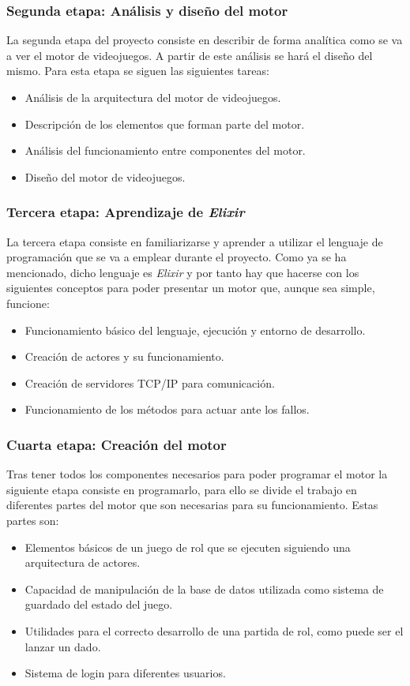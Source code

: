 \subsubsection{Segunda etapa: Análisis y diseño del motor}
La segunda etapa del proyecto consiste en describir de forma analítica como se va a ver el motor de videojuegos. A partir de este análisis se hará el diseño del mismo. Para esta etapa se siguen las siguientes tareas:
\\
\begin{itemize}
	\item Análisis de la arquitectura del motor de videojuegos.
	\item Descripción de los elementos que forman parte del motor.
	\item Análisis del funcionamiento entre componentes del motor.
	\item Diseño del motor de videojuegos.
\end{itemize}

\subsubsection{Tercera etapa: Aprendizaje de \textit{Elixir}}
La tercera etapa consiste en familiarizarse y aprender a utilizar el lenguaje de programación que se va a emplear durante el proyecto. Como ya se ha mencionado, dicho lenguaje es \textit{Elixir} y por tanto hay que hacerse con los siguientes conceptos para poder presentar un motor que, aunque sea simple, funcione:
\\
\begin{itemize}
	\item Funcionamiento básico del lenguaje, ejecución y entorno de desarrollo.
	\item Creación de actores y su funcionamiento.
	\item Creación de servidores TCP/IP para comunicación.
	\item Funcionamiento de los métodos para actuar ante los fallos.
\end{itemize}

\subsubsection{Cuarta etapa: Creación del motor}
Tras tener todos los componentes necesarios para poder programar el motor la siguiente etapa consiste en programarlo, para ello se divide el trabajo en diferentes partes del motor que son necesarias para su funcionamiento. Estas partes son:
\\
\begin{itemize}
	\item Elementos básicos de un juego de rol que se ejecuten siguiendo una arquitectura de actores.
	\item Capacidad de manipulación de la base de datos utilizada como sistema de guardado del estado del juego.
	\item Utilidades para el correcto desarrollo de una partida de rol, como puede ser el lanzar un dado.
	\item Sistema de login para diferentes usuarios.
\end{itemize}

